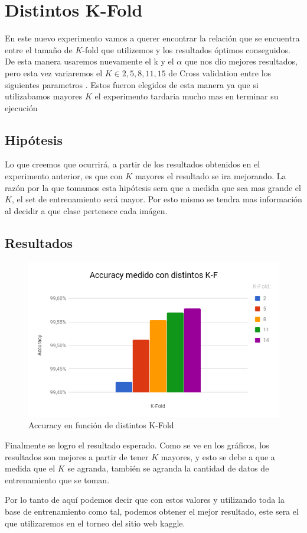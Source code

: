

\section{Distintos K-Fold}

En este nuevo experimento vamos a querer encontrar la relación que se encuentra entre el tamaño de $K$-fold que utilizemos y los resultados óptimos conseguidos. De esta manera usaremos nuevamente el k y el $\alpha$ que nos dio mejores resultados, pero esta vez variaremos el $K \in {2,5,8,11,15}$ de Cross validation entre los siguientes parametros . Estos fueron elegidos de esta manera ya que si utilizabamos mayores $K$ el experimento tardaria mucho mas en terminar su ejecución


\subsection{Hipótesis}

Lo que creemos que ocurrirá, a partir de los resultados obtenidos en el experimento anterior, es que con $K$ mayores el resultado se ira mejorando. La razón por la que tomamos esta hipótesis sera que a medida que sea mas grande el $K$, el set de entrenamiento será mayor. Por esto mismo se tendra mas información al decidir a que clase pertenece cada imágen.

\subsection{Resultados}


\begin{figure}
	\centering
	\includegraphics[width=\textwidth]{graficos/Distintos_kfold.png}
	\caption{Accuracy en función de distintos K-Fold}
	\label{fig:distintos_kfold}
\end{figure}

Finalmente se logro el resultado esperado. Como se ve en los gráficos, los resultados son mejores a partir de tener $K$ mayores, y esto se debe a que a medida que el $K$ se agranda, también se agranda la cantidad de datos de entrenamiento que se toman.

Por lo tanto de aquí podemos decir que con estos valores y utilizando toda la base de entrenamiento como tal, podemos obtener el mejor resultado, este sera el que utilizaremos en el torneo del sitio web kaggle.
